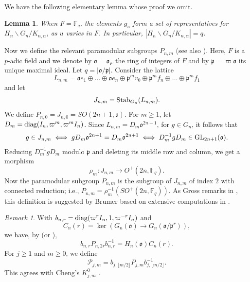 \documentclass[12pt]{amsart}
\newtheorem{lemma}[theorem]{Lemma}%
\theoremstyle{definition}
\theoremstyle{remark}
\newtheorem{remark}{Remark}
\begin{document}
We have the following elementary lemma whose proof we omit. 
\begin{lemma}\label{lemma-dc-f}
When $F=\mathbb F_q$, the elements $g_u$ form a set of representatives for $H_n\backslash G_n/K_{n,\alpha}$, as $u$ varies in $F$. In particular, $|H_n\backslash G_n/K_{n,\alpha}| = q$.
\end{lemma}

Now we define the relevant paramodular subgroups $P_{n,m}$ \cite[\S 2.2]{che22} (see also \cite[p. 684]{gro16}). Here, $F$ is a $p$-adic field and we denote by $\mathfrak o = \mathfrak o_F$ the ring of integers of $F$ and by $\mathfrak p = \varpi \mathfrak o$ its unique maximal ideal. Let $q= |\mathfrak o/\mathfrak p|$. Consider the lattice 
\[L_{n,m}= \mathfrak o e_1 \oplus \dots \oplus \mathfrak o e_n \oplus \mathfrak p^m v_0 \oplus \mathfrak p^m f_n \oplus \dots \oplus \mathfrak p^m f_1 \] and let
\[J_{n,m} = {\rm Stab}_{G_n}(L_{n,m}).\]
We define $P_{n,0} = J_{n,0} = SO(2n+1,\mathfrak o)$. For $m \geq 1$, let $D_m = {\rm diag}(I_n,\varpi^m,\varpi^m I_n)$. Since $L_{n,m} = D_m \mathfrak o^{2n+1}$, for $g \in G_n$, it follows that 
\[g \in J_{n,m} \iff g D_m\mathfrak o^{2n+1} = D_m\mathfrak o^{2n+1} \iff D_m^{-1}gD_m \in {\rm GL}_{2n+1}(\mathfrak o).\] 
Reducing $D_m^{-1}gD_m$ modulo $\mathfrak p$ and deleting its middle row and column, we get a morphism
\[\rho_m: J_{n,m} \rightarrow O^+(2n,\mathbb F_q).\]
Now the paramodular subgroup $P_{n,m}$ is the subgroup of $J_{n,m}$ of index $2$ with connected reduction; i.e., $P_{n,m}=\rho_m^{-1}(SO^+(2n,\mathbb F_q))$. As Gross remarks in \cite[p. 684]{gro16}, this definition is suggested by Brumer based on extensive computations in \cite{bk14}. 
\begin{remark}\label{rmk-para-conj}
With $b_{n,r}={\rm diag}(\varpi^r I_n,1,\varpi^{-r}I_n)$ and
\[
C_n(r)=\ker \left(G_n(\mathfrak o)\longrightarrow
G_n(\mathfrak o/\mathfrak p^r)\right),
\]
we have, by \cite[Proposition 7.1.3]{tsa13} (or \cite[Corollary 3.3]{che26}), 
\[b_{n,r}P_{n,2r}b_{n,r}^{-1}=H_n(\mathfrak o)C_n(r).\]
For $j\ge1$ and $m\ge0$, we define
\[
\mathcal P_{j,m}
=
b_{j,\lfloor m/2\rfloor}P_{j,m}
b_{j,\lfloor m/2\rfloor}^{-1}.
\]
This agrees with Cheng’s $K^0_{j,m}$ \cite[(3.8)]{che26}.
\end{remark}
\end{document}
